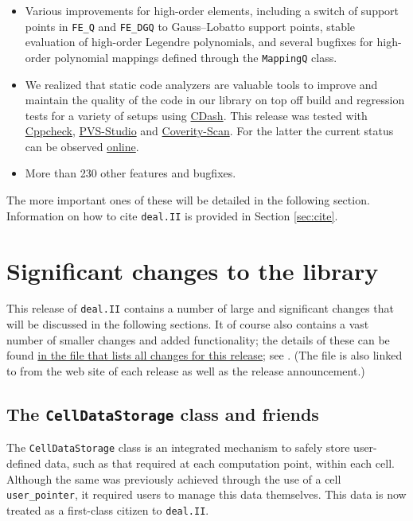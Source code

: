 \documentclass{ansarticle-preprint}
\newcommand{\specialword}[1]{\texttt{#1}}
\newcommand{\dealii}{{\specialword{deal.II}}}
\begin{document}
\begin{itemize}
\item Various improvements for high-order elements, including a switch of
  support points in \texttt{FE\_Q} and \texttt{FE\_DGQ} to Gauss--Lobatto
  support points, stable evaluation of high-order Legendre polynomials, and
  several bugfixes for high-order polynomial mappings defined through the
  \texttt{MappingQ} class.


\item We realized that static code analyzers are valuable tools to improve
  and maintain the quality of the code in our library on top off build and
  regression tests for a variety of setups using
  \href{https://cdash.kyomu.43-1.org/index.php?project=deal.II}{CDash}.
  This release was tested with
  \href{http://cppcheck.sourceforge.net/}{Cppcheck},
  \href{https://www.viva64.com/en/pvs-studio/}{PVS-Studio} and
  \href{https://scan.coverity.com/}{Coverity-Scan}. For the latter the
  current status can be observed
  \href{https://scan.coverity.com/projects/deal-ii}{online}.

  \item More than 230 other features and bugfixes.
\end{itemize}
The more important ones of these will be detailed in the following section.
Information on how to cite \dealii{} is provided in Section \ref{sec:cite}.



\section{Significant changes to the library}

This release of \dealii{} contains a number of large and significant changes
that will be discussed in the following sections. It of course also contains a
vast number of smaller changes and added functionality; the details of these
can be found
\href{https://www.dealii.org/8.5.0/doxygen/deal.II/changes_between_8_4_and_8_5.html}{in
the file that lists all changes for this release}; see \cite{changes85}.
(The file is also linked to from the web site of each release as well as
the release announcement.)


\subsection{The \texttt{CellDataStorage} class and friends}

The \texttt{CellDataStorage} class is an integrated mechanism to safely
store user-defined data, such as that required at each computation point,
within each cell. Although the same was previously achieved through the use
of a cell \texttt{user\_pointer}, it required users to manage this data
themselves. This data is now treated as a first-class citizen to \dealii{}.
\end{document}
